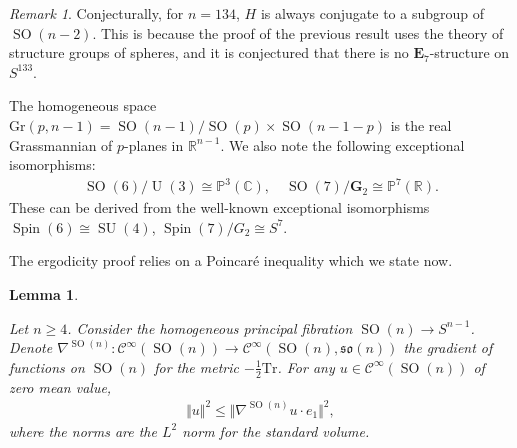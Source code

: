 \documentclass[12pt]{amsart}
\numberwithin{numbering}{section}
\theoremstyle{plain}
\newtheorem{lem}[numbering]{Lemma}
\theoremstyle{definition}
\theoremstyle{remark}
\newtheorem{rmq}[numbering]{Remark}
\numberwithin{equation}{section}
\DeclareMathOperator{\SO}{SO}
\DeclareMathOperator{\U}{U}
\DeclareMathOperator{\SU}{SU}
\DeclareMathOperator{\Spin}{Spin}
\newcommand{\R}{\mathbb{R}}
\newcommand{\C}{\mathbb{C}}
\newcommand{\frk}[1]{\mathfrak{#1}}
\begin{document}
\begin{rmq}
Conjecturally, for $n = 134$, $H$ is always conjugate to a subgroup of $\SO(n-2)$. This is because the proof of the previous result uses the theory of structure groups of spheres, and it is conjectured that there is no $\mathbf{E}_7$-structure on $S^{133}$.
\end{rmq}

The homogeneous space $\mathrm{Gr}(p, n-1) = \SO(n-1) / \SO(p) \times \SO(n-1-p)$ is the real Grassmannian of $p$-planes in $\R^{n-1}$. We also note the following exceptional isomorphisms:
\begin{align}
\SO(6) / \U(3) \cong \mathbb{P}^3(\C), \quad \SO(7) / \mathbf{G}_2 \cong \mathbb{P}^7(\R).
\end{align}
These can be derived from the well-known exceptional isomorphisms $\Spin(6) \cong \SU(4)$, $\Spin(7) / G_2 \cong S^7$.

The ergodicity proof relies on a Poincaré inequality which we state now. 
\begin{lem} \label{lem:poincare}
   
Let $n \geq 4$. Consider the homogeneous principal fibration $\SO(n) \to S^{n-1}$. Denote $\nabla^{\SO(n)}: \mathcal{C}^\infty(\SO(n)) \to \mathcal{C}^\infty(\SO(n), \frk{so}(n))$ the gradient of functions on $\SO(n)$ for the metric $- \frac{1}{2} \mathrm{Tr}$. For any $u \in \mathcal{C}^\infty(\SO(n))$ of zero mean value,
\begin{align}
\Vert u \Vert^2 \leq \Vert \nabla^{\SO(n)} u \cdot e_1 \Vert^2,
\end{align}
where the norms are the $L^2$ norm for the standard volume.
\end{lem}
\end{document}
